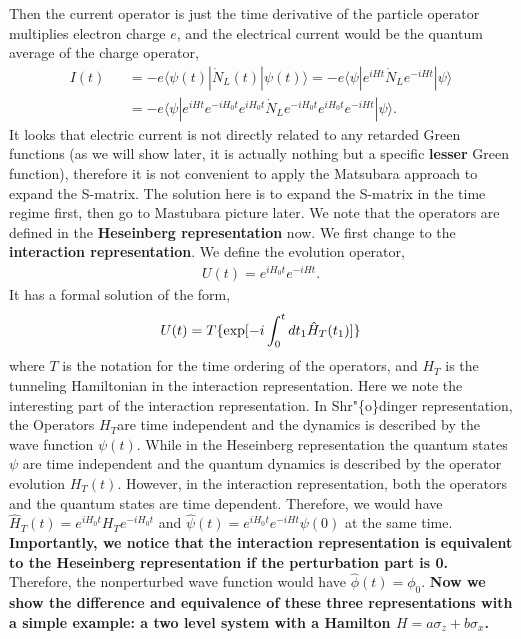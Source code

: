 \documentclass[11pt]{article}
\begin{document}
    Then the current operator is just the time derivative of the particle
operator multiplies electron charge \(e\), and the electrical current
would be the quantum average of the charge operator, \begin{eqnarray}
I(t)&&=-e \langle \psi(t)|\dot N_L(t)|\psi(t)\rangle=-e\langle\psi|e^{iHt}\dot
N_Le^{-iHt}|\psi\rangle\\\nonumber
&&=-e\langle\psi|e^{iHt}e^{-iH_0t}e^{iH_0t}\dot
N_Le^{-iH_0t}e^{iH_0t}e^{-iHt}|\psi\rangle.
\end{eqnarray} It looks that electric current is not directly related to
any retarded Green functions (as we will show later, it is actually
nothing but a specific \textbf{lesser} Green function), therefore it is
not convenient to apply the Matsubara approach to expand the S-matrix.
The solution here is to expand the S-matrix in the time regime first,
then go to Mastubara picture later. We note that the operators are
defined in the \textbf{Heseinberg representation} now. We first change
to the \textbf{interaction representation}. We define the evolution
operator, \begin{eqnarray}
U(t)=e^{iH_0t}e^{-iHt}.
\end{eqnarray} It has a formal solution of the form, \begin{eqnarray}
U(t)= T \{{\rm exp}[-i\int_0^t dt_1 \hat H_T(t_1)]\}
\end{eqnarray} where \(T\) is the notation for the time ordering of the
operators, and \(H_T\) is the tunneling Hamiltonian in the interaction
representation. Here we note the interesting part of the interaction
representation. In Shr"\{o\}dinger representation, the Operators
\(H_T\)are time independent and the dynamics is described by the wave
function \(\psi(t)\). While in the Heseinberg representation the quantum
states \(\psi\) are time independent and the quantum dynamics is
described by the operator evolution \(H_T(t)\). However, in the
interaction representation, both the operators and the quantum states
are time dependent. Therefore, we would have
\(\hat H_T(t) = e^{iH_0 t} H_T e^{-iH_0 t}\) and
\(\hat \psi(t) = e^{iH_0 t} e^{-iH t} \psi(0)\) at the same time.
\textbf{Importantly, we notice that the interaction representation is
equivalent to the Heseinberg representation if the perturbation part is
0.} Therefore, the nonperturbed wave function would have
\(\hat \phi (t) = \phi_0\). \textbf{Now we show the difference and
equivalence of these three representations with a simple example: a two
level system with a Hamilton \(H= a\sigma_z + b \sigma_x\).}
\end{document}
